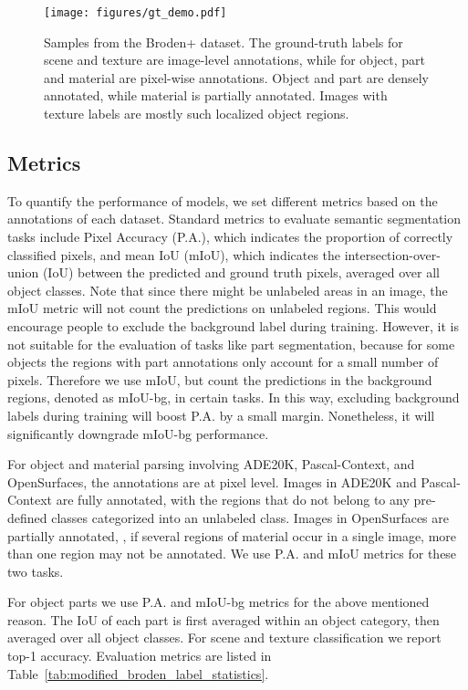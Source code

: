 \documentclass[runningheads]{llncs}
\begin{document}
\begin{figure}[!t]
\centering
\texttt{[image: figures/gt\_demo.pdf]}
\caption{Samples from the Broden+ dataset. The ground-truth labels for scene and texture are image-level annotations, while for object, part and material are pixel-wise annotations. Object and part are densely annotated, while material is partially annotated. Images with texture labels are mostly such localized object regions.}
\label{fig:ground_truth_examples}
\end{figure}


\subsection{Metrics}
\label{sec:metrics}

To quantify the performance of models, we set different metrics based on the annotations of each dataset. Standard metrics to evaluate semantic segmentation tasks include Pixel Accuracy (P.A.), which indicates the proportion of correctly classified pixels, and mean IoU (mIoU), which indicates the intersection-over-union (IoU) between the predicted and ground truth pixels, averaged over all object classes. Note that since there might be unlabeled areas in an image, the mIoU metric will not count the predictions on unlabeled regions. This would encourage people to exclude the background label during training. However, it is not suitable for the evaluation of tasks like part segmentation, because for some objects the regions with part annotations only account for a small number of pixels. Therefore we use mIoU, but count the predictions in the background regions, denoted as mIoU-bg, in certain tasks. In this way, excluding background labels during training will boost P.A. by a small margin. Nonetheless, it will significantly downgrade mIoU-bg performance. 

For object and material parsing involving ADE20K, Pascal-Context, and OpenSurfaces, the annotations are at pixel level. Images in ADE20K and Pascal-Context are fully annotated, with the regions that do not belong to any pre-defined classes categorized into an unlabeled class. Images in OpenSurfaces are partially annotated, \ie, if several regions of material occur in a single image, more than one region may not be annotated. We use P.A. and mIoU metrics for these two tasks. 

For object parts we use P.A. and mIoU-bg metrics for the above mentioned reason. The IoU of each part is first averaged within an object category, then averaged over all object classes. For scene and texture classification we report top-1 accuracy. Evaluation metrics are listed in Table~\ref{tab:modified_broden_label_statistics}.
\end{document}
